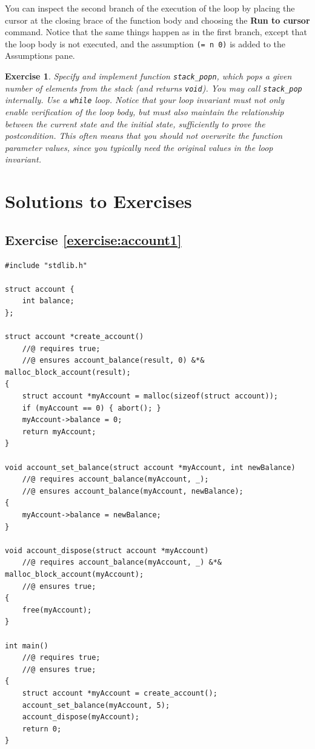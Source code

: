 \documentclass{article}
\newtheorem{exercise}{Exercise}
\begin{document}
You can inspect the second branch of the execution of the loop
by placing the cursor at the closing brace of the function body
and choosing the \textbf{Run to cursor} command. Notice that
the same things happen as in the first branch, except that the
loop body is not executed, and the assumption %
\lstinline!(= n 0)! is added to the Assumptions pane.

\begin{exercise}\label{exercise:stack3}
Specify and implement function \lstinline!stack_popn!, which
pops a given number of elements from the stack (and returns
\lstinline!void!). You may call \lstinline!stack_pop!
internally. Use a \lstinline!while! loop. Notice that your loop
invariant must not only enable verification of the loop body,
but must also maintain the relationship between the current
state and the initial state, sufficiently to prove the
postcondition. This often means that you should not overwrite
the function parameter values, since you typically need the
original values in the loop invariant.
\end{exercise}

\section{Solutions to Exercises}

\subsection{Exercise \ref{exercise:account1}}

\begin{lstlisting}
#include "stdlib.h"

struct account {
    int balance;
};

struct account *create_account()
    //@ requires true;
    //@ ensures account_balance(result, 0) &*& malloc_block_account(result);
{
    struct account *myAccount = malloc(sizeof(struct account));
    if (myAccount == 0) { abort(); }
    myAccount->balance = 0;
    return myAccount;
}

void account_set_balance(struct account *myAccount, int newBalance)
    //@ requires account_balance(myAccount, _);
    //@ ensures account_balance(myAccount, newBalance);
{
    myAccount->balance = newBalance;
}

void account_dispose(struct account *myAccount)
    //@ requires account_balance(myAccount, _) &*& malloc_block_account(myAccount);
    //@ ensures true;
{
    free(myAccount);
}

int main()
    //@ requires true;
    //@ ensures true;
{
    struct account *myAccount = create_account();
    account_set_balance(myAccount, 5);
    account_dispose(myAccount);
    return 0;
}
\end{lstlisting}
\end{document}
